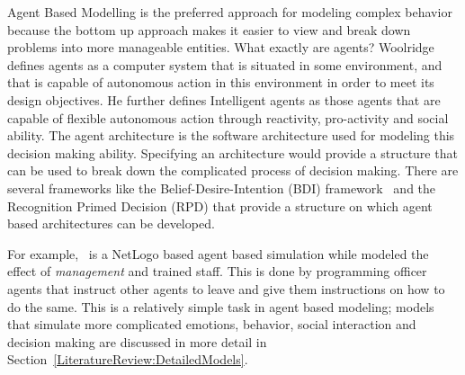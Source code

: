  Agent Based Modelling is the preferred approach for modeling complex behavior~\cite{Epstein:1999vn,Bonabeau:2002um,Li:2008wt} because the bottom up approach makes it easier to view and break down problems into more manageable entities. What exactly are agents? Woolridge~\cite{IntelligentAgentsWoolridge} defines agents as a computer system that is situated in some environment, and that is capable of autonomous action in this environment in order to meet its design objectives. He further defines Intelligent agents as those agents that are capable of flexible autonomous action through reactivity, pro-activity and social ability. The agent architecture is the software architecture used for modeling this decision making ability. Specifying an architecture would provide a structure that can be used to break down the complicated process of decision making. There are several frameworks like the Belief-Desire-Intention (BDI) framework~\cite{BDI} and the Recognition Primed Decision (RPD) that provide a structure on which agent based architectures can be developed.


 For example,~\cite{AugustijnBeckers:2010cr} is a NetLogo based agent based simulation while modeled the effect of \emph{management} and trained staff. This is done by programming officer agents that instruct other agents to leave and give them instructions on how to do the same. This is a relatively simple task in agent based modeling; models that simulate more complicated emotions, behavior, social interaction and decision making are discussed in more detail in Section~\ref{LiteratureReview:DetailedModels}.

